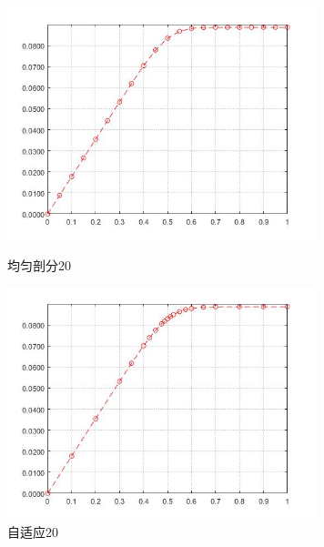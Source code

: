 \documentclass[12pt]{ctexart}
\begin{document}
\begin{figure}[H]
	\centering
	\begin{minipage}[t]{0.48\textwidth}
		\centering
		\includegraphics[width=9cm]{方程一，均匀剖分20.jpg}
		\caption{均匀剖分20}
	\end{minipage}
	\begin{minipage}[t]{0.48\textwidth}
		\centering
		\includegraphics[width=9cm]{方程一，自适应20.jpg}
		\caption{自适应20}
	\end{minipage}
\end{figure}
\end{document}

